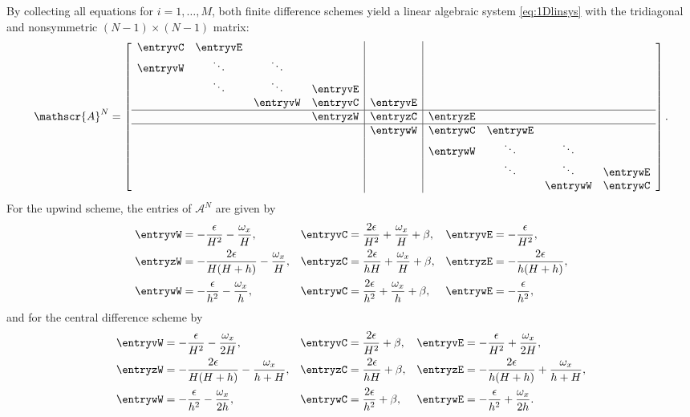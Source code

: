 By collecting all equations for $i=1,\ldots,M$, both finite difference schemes
yield a linear algebraic system \eqref{eq:1Dlinsys} with the tridiagonal and
nonsymmetric $(N-1)\times (N-1)$ matrix:
%
\begin{equation}\label{eq:back:1Dmatrix}
\mathscr{A}^{N}=\left[
  \begin{array}{cccc|c|cccc}
     \entryvC &\entryvE    &  &  &  &  &  &  &  \\
     \entryvW &\ddots &\ddots  &  &  &  &  &  &  \\
     &  \ddots& \ddots &  \entryvE   &  &  &  &  &  \\
     &  &\entryvW & \entryvC  & \entryvE   &  &  &  &  \\ \hline
     &  &  & \entryzW  & \entryzC  & \entryzE  &  &  &  \\ \hline
     &  &  &  & \entrywW  & \entrywC  & \entrywE  &  &  \\
     &  &  &  &  & \entrywW  & \ddots & \ddots &  \\
     &  &  &  &  &  & \ddots & \ddots & \entrywE  \\
     &  &  &  &  &  &  & \entrywW  & \entrywC  \\
  \end{array}
\right].%
\end{equation}
%
For the upwind scheme, the entries of $\mathscr{A}^{N}$ are given by
%
\begin{align}
    &\entryvW  =  -\frac{\epsilon}{H^{2}} - \frac{\omega_x}{H},&
    &\entryvC  =  \frac{2\epsilon}{H^{2}} + \frac{\omega_x}{H}+\beta, &
    &\entryvE   =  -\frac{\epsilon}{H^{2}}, \nonumber \\
    &\entryzW  =  -\frac{2\epsilon}{H(H+h)} - \frac{\omega_x}{H},&
    &\entryzC  =  \frac{2\epsilon}{hH} + \frac{\omega_x}{H}+\beta,&
    &\entryzE  =  -\frac{2\epsilon}{h(H+h)}, \label{eq:back:upwind} \\
    &\entrywW  =  -\frac{\epsilon}{h^{2}} - \frac{\omega_x}{h},&
    &\entrywC  =  \frac{2\epsilon}{h^{2}} + \frac{\omega_x}{h}+\beta,&
    &\entrywE  =  -\frac{\epsilon}{h^{2}}, \nonumber
\end{align}
%
and for the central difference scheme by
%
\begin{align}
    &\entryvW  =  -\frac{\epsilon}{H^{2}} - \frac{\omega_x}{2H},&
    &\entryvC  =  \frac{2\epsilon}{H^{2}} + \beta, &
    &\entryvE  =  -\frac{\epsilon}{H^{2}}+\frac{\omega_x}{2H}, \nonumber \\
    &\entryzW  =  -\frac{2\epsilon}{H(H+h)} -\frac{\omega_x}{h+H},&
    &\entryzC  =  \frac{2\epsilon}{hH} + \beta,&
    &\entryzE  =  -\frac{2\epsilon}{h(H+h)}+\frac{\omega_x}{h+H}, \label{eq:back:central} \\
    &\entrywW  =  -\frac{\epsilon}{h^{2}} - \frac{\omega_x}{2h},&
    &\entrywC  =  \frac{2\epsilon}{h^{2}} +\beta,&
    &\entrywE  =  -\frac{\epsilon}{h^{2}}+ \frac{\omega_x}{2h}. \nonumber
\end{align}

